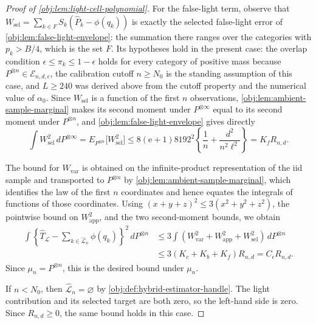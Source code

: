 \begin{proof}[Proof of \cref{obj:lem:light-cell-polynomial}]
For the false-light term, observe that
\(W_{\mathrm{sel}}=\sum_{k\in F}S_k(\widehat P_k-\phi(q_k))\)
is exactly the selected false-light error of \cref{obj:lem:false-light-envelope}: the summation there ranges over the categories with \(p_k>B/4\), which is the set \(F\).  Its hypotheses hold in the present case: the overlap condition \(\epsilon\le\pi_k\le1-\epsilon\) holds for every category of positive mass because \(P^{\otimes n}\in\mathcal E_{n,d,\epsilon}\), the calibration cutoff \(n\ge N_0\) is the standing assumption of this case, and \(L\ge240\) was derived above from the cutoff property and the numerical value of \(\alpha_0\).  Since \(W_{\mathrm{sel}}\) is a function of the first \(n\) observations, \cref{obj:lem:ambient-sample-marginal} makes its second moment under \(P^{\otimes\infty}\) equal to its second moment under \(P^{\otimes n}\), and \cref{obj:lem:false-light-envelope} gives directly
\[
\int W_{\mathrm{sel}}^2\,dP^{\otimes\infty}
=
E_{P^{\otimes n}}\bigl[W_{\mathrm{sel}}^2\bigr]
\le
8(\mathrm e+1)8192^2
\left\{\frac1n+\frac{d^2}{n^2\ell^2}\right\}
=
K_fR_{n,d}.
\] %

The bound for \(W_{\mathrm{var}}\) is obtained on the infinite-product representation of the iid sample and transported to \(P^{\otimes n}\) by \cref{obj:lem:ambient-sample-marginal}, which identifies the law of the first \(n\) coordinates and hence equates the integrals of functions of those coordinates.  Using \((x+y+z)^2\le3(x^2+y^2+z^2)\), the pointwise bound on \(W_{\mathrm{app}}^2\), and the two second-moment bounds, we obtain
\[
\begin{aligned}
\int
\left\{
\widehat T_{\mathcal L}
-
\sum_{k\in\widehat{\mathcal L}_n}\phi(q_k)
\right\}^2
\,dP^{\otimes n}
&\le
3\int(W_{\mathrm{var}}^2+W_{\mathrm{app}}^2+W_{\mathrm{sel}}^2)\,dP^{\otimes n} \\
&\le
3(K_c+K_b+K_f)R_{n,d}
=
C_\epsilon R_{n,d}.
\end{aligned}
\] %
Since \(\mu_n=P^{\otimes n}\), this is the desired bound under \(\mu_n\).

If \(n<N_0\), then \(\widehat{\mathcal L}_n=\varnothing\) by \cref{obj:def:hybrid-estimator-handle}.  The light contribution and its selected target are both zero, so the left-hand side is zero.  Since \(R_{n,d}\ge0\), the same bound holds in this case. %
\end{proof}
